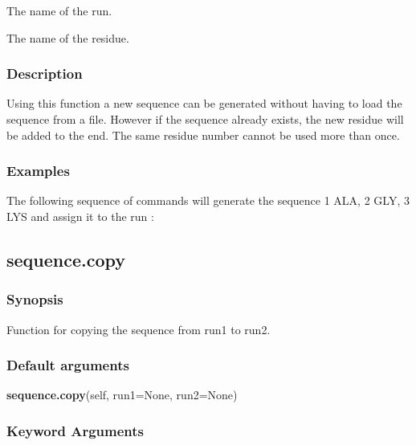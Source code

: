   The name of the run.

  The name of the residue.


\subsubsection{Description}

Using this function a new sequence can be generated without having to load the sequence from
a file.  However if the sequence already exists, the new residue will be added to the end.
The same residue number cannot be used more than once.


\subsubsection{Examples}

The following sequence of commands will generate the sequence 1 ALA, 2 GLY, 3 LYS and assign
it to the run 
:







\newpage

\subsection{sequence.copy}


\subsubsection{Synopsis}

Function for copying the sequence from run1 to run2.

\subsubsection{Default arguments}

\textsf{\textbf{sequence.copy}(self, run1=None, run2=None)}


\subsubsection{Keyword Arguments}

